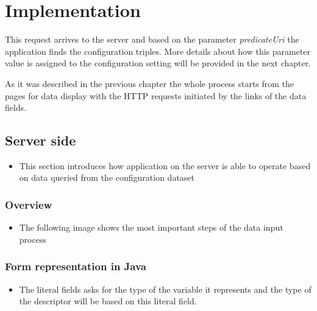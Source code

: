 \section{Implementation} \label{52}


This request arrives to the server and based on the parameter \textit{predicateUri} the application finds the configuration triples. More details about how this parameter value is assigned to the configuration setting will be provided in the next chapter.

As it was described in the previous chapter the whole process starts from the pages for data display with the HTTP requests initiated by the links of the data fields. 



\subsection{Server side} 

\begin{itemize}
	\item This section introduces how application on the server is able to operate based on data queried from the configuration dataset
	
\end{itemize}

\subsubsection{Overview}

\begin{itemize}
	\item The following image shows the most important steps of the data input process
\end{itemize}



\subsubsection{Form representation in Java}


\begin{itemize}
	\item The literal fields asks for the type of the variable it represents and the type of the descriptor will be based on this literal field.
\end{itemize}


